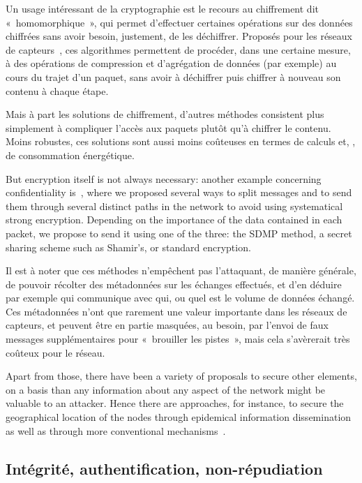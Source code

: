 Un usage intéressant de la cryptographie est le recours au chiffrement dit « homomorphique », qui permet d'effectuer certaines opérations sur des données chiffrées sans avoir besoin, justement, de les déchiffrer.
Proposés pour les réseaux de capteurs~\cite{BBTY14}, ces algorithmes permettent de procéder, dans une certaine mesure, à des opérations de compression et d'agrégation de données (par exemple) au cours du trajet d'un paquet, sans avoir à déchiffrer puis chiffrer à nouveau son contenu à chaque étape.

Mais à part les solutions de chiffrement, d'autres méthodes consistent plus simplement à compliquer l'accès aux paquets plutôt qu'à chiffrer le contenu.
Moins robustes, ces solutions sont aussi moins coûteuses en termes de calculs et, \infine, de consommation énergétique.

But encryption itself is not always necessary: another example concerning confidentiality is~\cite{MMB13}, where we proposed several ways to split messages and to send them through several distinct paths in the network to avoid using systematical strong encryption.
Depending on the importance of the data contained in each packet, we propose to send it using one of the three: the SDMP method\cite{BM10}, a secret sharing scheme such as Shamir's\cite{Sha79}, or standard encryption.



Il est à noter que ces méthodes n'empêchent pas l'attaquant, de manière générale, de pouvoir récolter des métadonnées sur les échanges effectués, et d'en déduire par exemple qui communique avec qui, ou quel est le volume de données échangé.
Ces métadonnées n'ont que rarement une valeur importante dans les réseaux de capteurs, et peuvent être en partie masquées, au besoin, par l'envoi de faux messages supplémentaires pour « brouiller les pistes », mais cela s'avèrerait très coûteux pour le réseau.


Apart from those, there have been a variety of proposals to secure other elements, on a basis than any information about any aspect of the network might be valuable to an attacker.
Hence there are approaches, for instance, to secure the geographical location of the nodes through epidemical information dissemination~\cite{KDA14} as well as through more conventional mechanisms~\cite{GK13}.

\subsection{Intégrité, authentification, non-répudiation}



